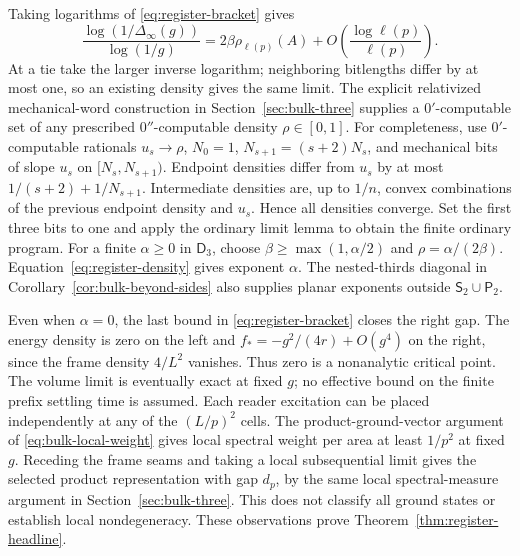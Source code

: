 Taking logarithms of \eqref{eq:register-bracket} gives
\begin{equation}\label{eq:register-density}
 \frac{\log(1/\Delta_\infty(g))}{\log(1/g)}
 =2\beta\rho_{\ell(p)}(A)
   +O\!\left(\frac{\log\ell(p)}{\ell(p)}\right).
\end{equation}
At a tie take the larger inverse logarithm; neighboring bitlengths
differ by at most one, so an existing density gives the same limit.
The explicit relativized mechanical-word construction in
Section~\ref{sec:bulk-three} supplies a $0'$-computable set of any
prescribed $0''$-computable density $\rho\in[0,1]$.
For completeness, use $0'$-computable rationals $u_s\to\rho$,
$N_0=1$, $N_{s+1}=(s+2)N_s$, and mechanical bits of slope $u_s$
on $[N_s,N_{s+1})$. Endpoint densities differ from $u_s$ by at most
$1/(s+2)+1/N_{s+1}$. Intermediate densities are, up to $1/n$,
convex combinations of the previous endpoint density and $u_s$.
Hence all densities converge. Set the first three bits to one and
apply the ordinary limit lemma to obtain the finite ordinary program.
For a finite $\alpha\geq0$ in $\mathsf D_3$, choose
$\beta\geq\max(1,\alpha/2)$ and $\rho=\alpha/(2\beta)$.
Equation~\eqref{eq:register-density} gives exponent $\alpha$.
The nested-thirds diagonal in Corollary~\ref{cor:bulk-beyond-sides}
also supplies planar exponents outside
$\mathsf S_2\cup\mathsf P_2$.

Even when $\alpha=0$, the last bound in
\eqref{eq:register-bracket} closes the right gap. The energy density
is zero on the left and $f_*=-g^2/(4r)+O(g^4)$ on the right, since
the frame density $4/L^2$ vanishes. Thus zero is a nonanalytic
critical point. The volume limit is eventually exact at fixed $g$;
no effective bound on the finite prefix settling time is assumed.
Each reader excitation can be placed independently at any of the
$(L/p)^2$ cells. The product-ground-vector argument of
\eqref{eq:bulk-local-weight} gives local spectral weight per area
at least $1/p^2$ at fixed $g$. Receding the frame seams and taking a
local subsequential limit gives the selected product representation
with gap $d_p$, by the same local spectral-measure argument in
Section~\ref{sec:bulk-three}. This does not classify all ground states
or establish local nondegeneracy. These observations prove
Theorem~\ref{thm:register-headline}.

